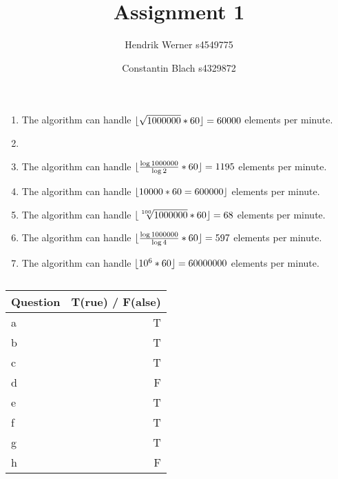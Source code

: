 \documentclass[12pt]{article}
\title {Assignment 1}
\author {
	Hendrik Werner s4549775
	\and Constantin Blach s4329872
}
\DeclarePairedDelimiter\floor{\lfloor}{\rfloor}
\begin{document}
\maketitle

\section{} %
\subsection{} %
\begin{enumerate}[a]
	\item %
	The algorithm can handle $\floor{\sqrt{1000000} * 60} = 60000$ elements per minute.

	\item %
	\item %
	The algorithm can handle $\floor{\frac{\log{1000000}}{\log{2}} * 60} = 1195$ elements per minute.

	\item %
	The algorithm can handle $\floor{10000 * 60 = 600000}$ elements per minute.

	\item %
	The algorithm can handle $\floor{\sqrt[100]{1000000} * 60} = 68$ elements per minute.

	\item %
	The algorithm can handle $\floor{\frac{\log{1000000}}{\log{4}} * 60} = 597$ elements per minute.

	\item %
	The algorithm can handle $\floor{10^6 * 60} = 60000000$ elements per minute.
\end{enumerate}

\subsection{} %
\begin{tabular}{|l|r|}
	\hline
	Question & T(rue) / F(alse) \\
	\hline
	a & T\\
	b & T\\
	c & T\\
	d & F\\
	e & T\\
	f & T\\
	g & T\\
	h & F\\
	\hline
\end{tabular}
\end{document}
